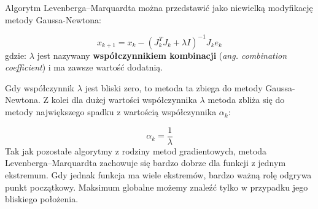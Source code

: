 \documentclass{pracamgr}
\begin{document}
Algorytm Levenberga–Marquardta można przedstawić jako niewielką modyfikację metody Gaussa-Newtona:


\begin{equation} 
  x_{k+1} = x_k - (J_k^TJ_k + \lambda I)^{-1}J_k e_k
\end{equation}
gdzie: $\lambda$ jest nazywany 
\textbf{współczynnikiem kombinacji} (\textit{ang. combination coefficient}) i 
ma zawsze wartość dodatnią.

Gdy współczynnik $\lambda$ jest bliski zero, to metoda ta zbiega do metody Gaussa-Newtona. 
Z kolei dla dużej wartości współczynnika $\lambda$ metoda zbliża się do metody największego spadku
z wartością współczynnika $\alpha_k$:

\begin{equation}
  \alpha_k = \frac{1}{\lambda}
\end{equation}
Tak jak pozostałe algorytmy z rodziny metod gradientowych, metoda Levenberga–Marquardta zachowuje się
bardzo dobrze dla funkcji z jednym ekstremum. Gdy jednak funkcja ma wiele ekstremów, bardzo ważną
rolę odgrywa punkt początkowy. Maksimum globalne możemy znaleźć tylko w przypadku jego bliskiego
położenia.





\end{document}
